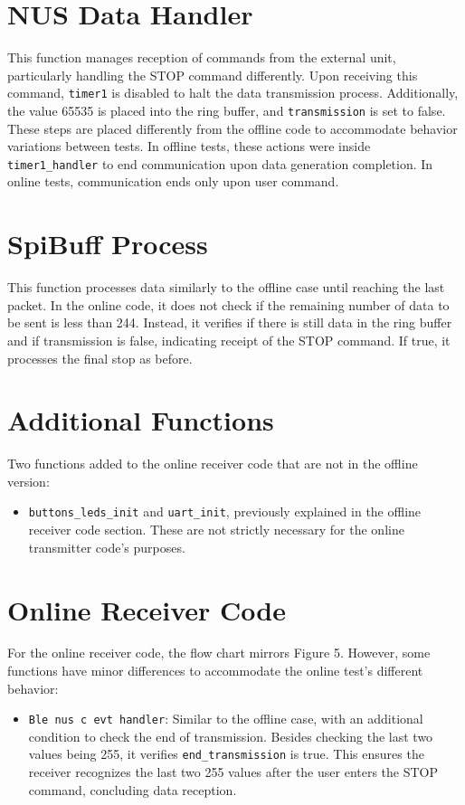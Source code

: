 \documentclass{Configuration_Files/PoliMi3i_thesis}
\begin{document}
\section*{NUS Data Handler}
This function manages reception of commands from the external unit, particularly handling the STOP command differently. Upon receiving this command, \texttt{timer1} is disabled to halt the data transmission process. Additionally, the value 65535 is placed into the ring buffer, and \texttt{transmission} is set to false. These steps are placed differently from the offline code to accommodate behavior variations between tests. In offline tests, these actions were inside \texttt{timer1\_handler} to end communication upon data generation completion. In online tests, communication ends only upon user command.

\section*{SpiBuff Process}
This function processes data similarly to the offline case until reaching the last packet. In the online code, it does not check if the remaining number of data to be sent is less than 244. Instead, it verifies if there is still data in the ring buffer and if transmission is false, indicating receipt of the STOP command. If true, it processes the final stop as before.

\section*{Additional Functions}
Two functions added to the online receiver code that are not in the offline version:
\begin{itemize}
    \item \texttt{buttons\_leds\_init} and \texttt{uart\_init}, previously explained in the offline receiver code section. These are not strictly necessary for the online transmitter code's purposes.
\end{itemize}

\section*{Online Receiver Code}
For the online receiver code, the flow chart mirrors Figure 5. However, some functions have minor differences to accommodate the online test's different behavior:
\begin{itemize}
    \item \texttt{Ble nus c evt handler}: Similar to the offline case, with an additional condition to check the end of transmission. Besides checking the last two values being 255, it verifies \texttt{end\_transmission} is true. This ensures the receiver recognizes the last two 255 values after the user enters the STOP command, concluding data reception.
\end{itemize}
\end{document}
